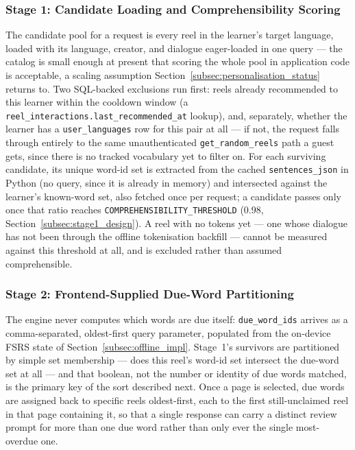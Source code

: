         \subsubsection{Stage 1: Candidate Loading and Comprehensibility Scoring}
        The candidate pool for a request is every reel in the learner's target language, loaded with its language, creator, and dialogue eager-loaded in one query --- the catalog is small enough at present that scoring the whole pool in application code is acceptable, a scaling assumption Section~\ref{subsec:personalisation_status} returns to. Two SQL-backed exclusions run first: reels already recommended to this learner within the cooldown window (a \texttt{reel\_interactions.last\_recommended\_at} lookup), and, separately, whether the learner has a \texttt{user\_languages} row for this pair at all --- if not, the request falls through entirely to the same unauthenticated \texttt{get\_random\_reels} path a guest gets, since there is no tracked vocabulary yet to filter on. For each surviving candidate, its unique word-id set is extracted from the cached \texttt{sentences\_json} in Python (no query, since it is already in memory) and intersected against the learner's known-word set, also fetched once per request; a candidate passes only once that ratio reaches \texttt{COMPREHENSIBILITY\_THRESHOLD} (0.98, Section~\ref{subsec:stage1_design}). A reel with no tokens yet --- one whose dialogue has not been through the offline tokenisation backfill --- cannot be measured against this threshold at all, and is excluded rather than assumed comprehensible.

        \subsubsection{Stage 2: Frontend-Supplied Due-Word Partitioning}
        The engine never computes which words are due itself: \texttt{due\_word\_ids} arrives as a comma-separated, oldest-first query parameter, populated from the on-device FSRS state of Section~\ref{subsec:offline_impl}. Stage~1's survivors are partitioned by simple set membership --- does this reel's word-id set intersect the due-word set at all --- and that boolean, not the number or identity of due words matched, is the primary key of the sort described next. Once a page is selected, due words are assigned back to specific reels oldest-first, each to the first still-unclaimed reel in that page containing it, so that a single response can carry a distinct review prompt for more than one due word rather than only ever the single most-overdue one.

